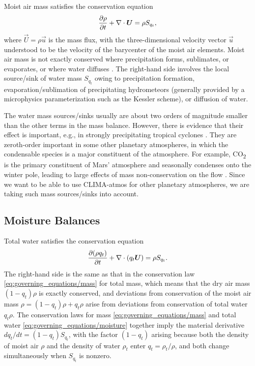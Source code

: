 \documentclass{article}
\begin{document}
Moist air mass satisfies the conservation equation
\begin{equation}
\frac{\partial \rho}{\partial t} + \nabla \cdot \boldsymbol{{U}} = \rho S_{q_t},
\label{eq:governing_equations/mass}
\end{equation}
where $\vec{U}=\rho \vec{u}$ is the mass flux, with the three-dimensional velocity vector $\vec{u}$ understood to be the velocity of the barycenter of the moist air elements. Moist air mass is not exactly conserved where precipitation forms, sublimates, or evaporates, or where water diffuses \citep{Bott08a}. The  right-hand side involves the local source/sink of water mass $S_{q_t}$ owing to precipitation formation, evaporation/sublimation of precipitating hydrometeors (generally provided by a microphysics parameterization such as the Kessler scheme), or diffusion of water. 

The water mass sources/sinks usually are about two orders of magnitude smaller than the other terms in the mass balance. However, there is evidence that their effect is important, e.g., in strongly precipitating tropical cyclones \citep{Qiu93a,Lackmann04a}. They are zeroth-order important in some other planetary atmospheres, in which the condensable species is a major constituent of the atmosphere. For example, CO\textsubscript{2} is the primary constituent of Mars' atmosphere and seasonally condenses onto the winter pole, leading to large effects of mass non-conservation on the flow \cite[e.g.,][]{Soto15a}. Since we want to be able to use CLIMA-atmos for other planetary atmospheres, we are taking such mass sources/sinks into account.

\subsection{Moisture Balances}

Total water satisfies the conservation equation
\begin{equation}
\frac{\partial (\rho q_t)}{\partial t} + \nabla \cdot (q_t \boldsymbol{{U}}) = \rho S_{q_t}.   
\label{eq:governing_equations/moisture}
\end{equation}
The right-hand side is the same as that in the conservation law \eqref{eq:governing_equations/mass} for total mass, which means that the dry air mass $(1-q_t)\rho$ is exactly conserved, and deviations from conservation of the moist air mass $\rho = (1-q_t)\rho + q_t \rho$ arise from deviations from conservation of total water $q_t\rho$. The conservation laws for mass \eqref{eq:governing_equations/mass} and total water \eqref{eq:governing_equations/moisture} together imply the material derivative $dq_t/dt = (1-q_t) S_{q_t}$, with the factor $(1-q_t)$ arising because both the density of moist air $\rho$ and the density of water $\rho_t$ enter $q_t = \rho_t/\rho$, and both change simultaneously when $S_{q_t}$ is nonzero.
\end{document}
